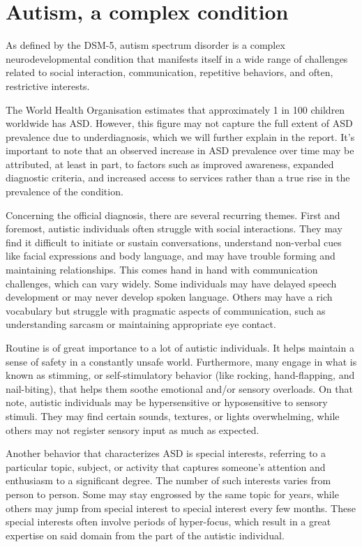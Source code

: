 \section{Autism, a complex condition}

As defined by the DSM-5, autism spectrum disorder is a complex neurodevelopmental condition that manifests itself in a wide range of challenges related to social interaction, communication, repetitive behaviors, and often, restrictive interests.

The World Health Organisation estimates that approximately 1 in 100 children worldwide has ASD. However, this figure may not capture the full extent of ASD prevalence due to underdiagnosis, which we will further explain in the report. It's important to note that an observed increase in ASD prevalence over time may be attributed, at least in part, to factors such as improved awareness, expanded diagnostic criteria, and increased access to services rather than a true rise in the prevalence of the condition.

Concerning the official diagnosis, there are several recurring themes. First and foremost, autistic individuals often struggle with social interactions. They may find it difficult to initiate or sustain conversations, understand non-verbal cues like facial expressions and body language, and may have trouble forming and maintaining relationships. This comes hand in hand with communication challenges, which can vary widely. Some individuals may have delayed speech development or may never develop spoken language. Others may have a rich vocabulary but struggle with pragmatic aspects of communication, such as understanding sarcasm or maintaining appropriate eye contact.

Routine is of great importance to a lot of autistic individuals. It helps maintain a sense of safety in a constantly unsafe world. Furthermore, many engage in what is known as stimming, or self-stimulatory behavior (like rocking, hand-flapping, and nail-biting), that helps them soothe emotional and/or sensory overloads. On that note, autistic individuals may be hypersensitive or hyposensitive to sensory stimuli. They may find certain sounds, textures, or lights overwhelming, while others may not register sensory input as much as expected.

Another behavior that characterizes ASD is special interests, referring to a particular topic, subject, or activity that captures someone's attention and enthusiasm to a significant degree. The number of such interests varies from person to person. Some may stay engrossed by the same topic for years, while others may jump from special interest to special interest every few months. These special interests often involve periods of hyper-focus, which result in a great expertise on said domain from the part of the autistic individual.

